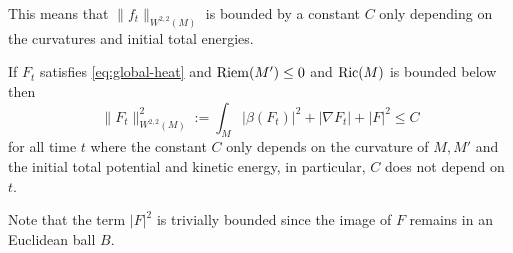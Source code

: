 This means that \(\|f_t\|_{W^{2,2}(M)}\) is bounded by a constant \(C\) only depending
on the curvatures and initial total energies.


\begin{corollary}[Boundedness in \( W^{2,2}(M) \)]
\label{cor:bound-2-2}
If \(F_t\) satisfies \eqref{eq:global-heat} and \(\mathop{\rm Riem}\nolimits(M')\leq 0\) and \(\mathop{\rm Ric}\nolimits(M)\)
is bounded below then
\[
\|F_t\|^2_{W^{2,2}(M)} := \int_M | \beta(F_t)|^2 + |\nabla F_t| +|F|^2 \leq C
\]
for all time \(t\) where the constant \(C\) only depends on the curvature of \(M, M'\) and the initial total potential and kinetic energy, in particular, \(C\) does not depend on \(t\).
\end{corollary}

Note that the term \(|F|^2\) is trivially bounded since the image of \(F\) remains in
an Euclidean ball \(B\).
